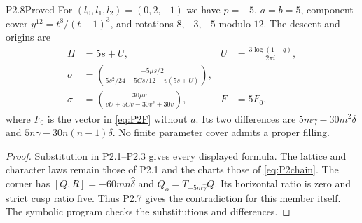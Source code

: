 \begin{statement}{P2.8}{Proved}
For $(l_0,l_1,l_2)=(0,2,-1)$ we have $p=-5$, $a=b=5$, component cover $y^{12}=t^8/(t-1)^3$, and rotations $8,-3,-5$ modulo $12$. The descent and origins are
\begin{align*}
 H&=5s+U,& U&=\frac{3\log(1-q)}{2\pi i},\\
 o&=\binom{-5\mu s/2}{5s^2/24-5Cs/12+v(5s+U)},\\
 \sigma&=\binom{30\mu v}{vU+5Cv-30v^2+30v},& F&=5F_0,
\end{align*}
where $F_0$ is the vector in \eqref{eq:P2F} without $a$. Its two differences are $5m\gamma-30m^2\delta$ and $5n\gamma-30n(n-1)\delta$. No finite parameter cover admits a proper filling.
\end{statement}
\begin{proof}
Substitution in P2.1--P2.3 gives every displayed formula. The lattice and character laws remain those of P2.1 and the charts those of \eqref{eq:P2chain}. The corner has $[Q,R]=-60mn\widehat\delta$ and $Q_o=T_{-5m\widehat\gamma}Q$. Its horizontal ratio is zero and strict cusp ratio five. Thus P2.7 gives the contradiction for this member itself. The symbolic program checks the substitutions and differences.
\end{proof}

